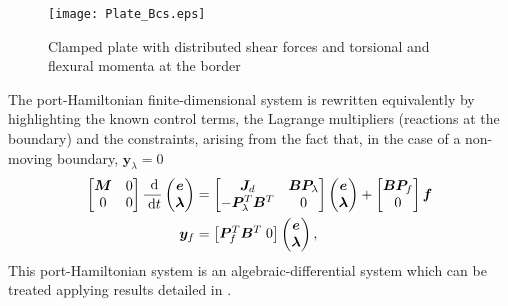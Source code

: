 \documentclass[preprint,12pt]{elsarticle}
\newcommand{\RevTwo}[1]{\textcolor{red!80!black}{#1}}
\begin{document}
\begin{figure}[t]
	\centering
	\texttt{[image: Plate\_Bcs.eps]}
	\caption{Clamped plate with distributed shear forces and torsional and flexural momenta at the border}
	\label{fig:mix_bcs}
\end{figure}

The port-Hamiltonian finite-dimensional system is rewritten equivalently by highlighting the known control terms, the Lagrange multipliers (reactions at the boundary) and the constraints, arising from the fact that, in the case of a non-moving boundary, $\bm{y}_{\lambda} = 0$
\RevTwo{
\begin{equation}
\label{eq:PHdiscr_mixed}
\begin{aligned}
\begin{bmatrix}
\bm{M} & 0 \\
0 & 0 \\
\end{bmatrix}
\frac{\d}{\d t}
\begin{pmatrix}
\bm{e}\\
\bm{\lambda}\\
\end{pmatrix} &=
\begin{bmatrix}
\bm{J}_d & \bm{B} \bm{P}_{\lambda} \\
-\bm{P}_{\lambda}^T \bm{B}^T & 0 \\
\end{bmatrix}
\begin{pmatrix}
\bm{e}\\
\bm{\lambda}\\
\end{pmatrix} + 
\begin{bmatrix}
\bm{B} \bm{P}_{f} \\
0 \\
\end{bmatrix} \bm{f}  
\\
\bm{y}_{f} &= \begin{bmatrix} \bm{P}_{f}^T \bm{B}^T \; 0 \end{bmatrix} \begin{pmatrix}
\bm{e}\\
\bm{\lambda}\\
\end{pmatrix}, 
\end{aligned}
\end{equation}
}
This port-Hamiltonian system is an algebraic-differential system which can be treated applying results detailed in \cite{vanderSchaft2013,beattie2018linear}.
\end{document}
